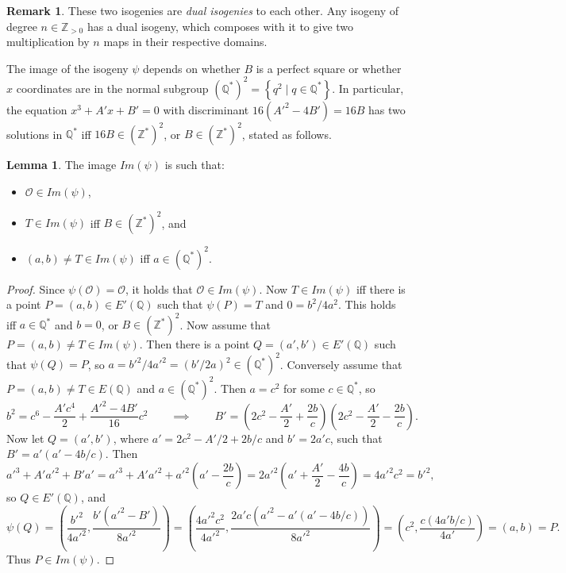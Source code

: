 \documentclass{article}
\newcommand{\Z}{\mathbb{Z}}
\newcommand{\Q}{\mathbb{Q}}
\newcommand{\rb}[1]{\left( #1 \right)}
\newcommand{\cb}[1]{\left\{ #1 \right\}}
\theoremstyle{definition}\newtheorem*{definition}{Definition}
\theoremstyle{definition}\newtheorem*{example}{Example}
\theoremstyle{definition}\newtheorem*{remark}{Remark}
\newtheorem{lemma}[proposition]{Lemma}
\begin{document}
\begin{remark}
These two isogenies are \emph{dual isogenies} to each other. Any isogeny of degree $ n \in \Z_{> 0} $ has a dual isogeny, which composes with it to give two multiplication by $ n $ maps in their respective domains.
\end{remark}

\pagebreak

The image of the isogeny $ \psi $ depends on whether $ B $ is a perfect square or whether $ x $ coordinates are in the normal subgroup $ \rb{\Q^*}^2 = \cb{q^2 \mid q \in \Q^*} $. In particular, the equation $ x^3 + A'x + B' = 0 $ with discriminant $ 16\rb{A'^2 - 4B'} = 16B $ has two solutions in $ \Q^* $ iff $ 16B \in \rb{\Z^*}^2 $, or $ B \in \rb{\Z^*}^2 $, stated as follows.

\begin{lemma}
The image $ Im\rb{\psi} $ is such that:
\begin{itemize}
\item $ \mathcal{O} \in Im\rb{\psi} $,
\item $ T \in Im\rb{\psi} $ iff $ B \in \rb{\Z^*}^2 $, and
\item $ \rb{a, b} \ne T \in Im\rb{\psi} $ iff $ a \in \rb{\Q^*}^2 $.
\end{itemize}
\end{lemma}

\begin{proof}
Since $ \psi\rb{\mathcal{O}} = \mathcal{O} $, it holds that $ \mathcal{O} \in Im\rb{\psi} $. Now $ T \in Im\rb{\psi} $ iff there is a point $ P = \rb{a, b} \in E'\rb{\Q} $ such that $ \psi\rb{P} = T $ and $ 0 = b^2 / 4a^2 $. This holds iff $ a \in \Q^* $ and $ b = 0 $, or $ B \in \rb{\Z^*}^2 $. Now assume that $ P = \rb{a, b} \ne T \in Im\rb{\psi} $. Then there is a point $ Q = \rb{a', b'} \in E'\rb{\Q} $ such that $ \psi\rb{Q} = P $, so $ a = b'^2 / 4a'^2 = \rb{b' / 2a}^2 \in \rb{\Q^*}^2 $. Conversely assume that $ P = \rb{a, b} \ne T \in E\rb{\Q} $ and $ a \in \rb{\Q^*}^2 $. Then $ a = c^2 $ for some $ c \in \Q^* $, so
$$ b^2 = c^6 - \dfrac{A'c^4}{2} + \dfrac{A'^2 - 4B'}{16}c^2 \qquad \implies \qquad B' = \rb{2c^2 - \dfrac{A'}{2} + \dfrac{2b}{c}}\rb{2c^2 - \dfrac{A'}{2} - \dfrac{2b}{c}}. $$
Now let $ Q = \rb{a', b'} $, where $ a' = 2c^2 - A' / 2 + 2b / c $ and $ b' = 2a'c $, such that $ B' = a'\rb{a' - 4b / c} $. Then
$$ a'^3 + A'a'^2 + B'a' = a'^3 + A'a'^2 + a'^2\rb{a' - \dfrac{2b}{c}} = 2a'^2\rb{a' + \dfrac{A'}{2} - \dfrac{4b}{c}} = 4a'^2c^2 = b'^2, $$
so $ Q \in E'\rb{\Q} $, and
$$ \psi\rb{Q} = \rb{\dfrac{b'^2}{4a'^2}, \dfrac{b'\rb{a'^2 - B'}}{8a'^2}} = \rb{\dfrac{4a'^2c^2}{4a'^2}, \dfrac{2a'c\rb{a'^2 - a'\rb{a' - 4b / c}}}{8a'^2}} = \rb{c^2, \dfrac{c\rb{4a'b / c}}{4a'}} = \rb{a, b} = P. $$
Thus $ P \in Im\rb{\psi} $.
\end{proof}
\end{document}
